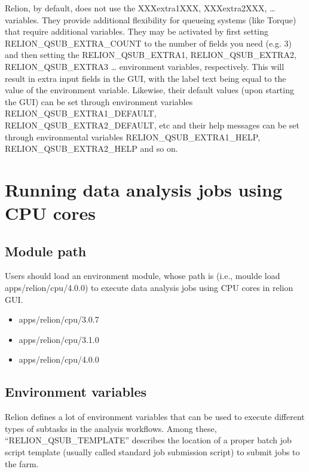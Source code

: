 \documentclass[a4paper,11pt,english]{sphinxmanual}
\begin{document}
\sphinxAtStartPar
Relion, by default, does not use the XXXextra1XXX, XXXextra2XXX, … variables.
They provide additional flexibility for queueing systems (like Torque) that require additional variables.
They may be activated by first setting RELION\_QSUB\_EXTRA\_COUNT to the number of fields you need (e.g. 3) and then setting the RELION\_QSUB\_EXTRA1, RELION\_QSUB\_EXTRA2, RELION\_QSUB\_EXTRA3 … environment variables, respectively.
This will result in extra input fields in the GUI, with the label text being equal to the value of the environment variable. Likewise, their default values (upon starting the GUI) can be set through environment variables RELION\_QSUB\_EXTRA1\_DEFAULT, RELION\_QSUB\_EXTRA2\_DEFAULT, etc and their help messages can be set through environmental variables RELION\_QSUB\_EXTRA1\_HELP, RELION\_QSUB\_EXTRA2\_HELP and so on.


\section{Running data analysis jobs using CPU cores}
\label{\detokenize{relion:running-data-analysis-jobs-using-cpu-cores}}

\subsection{Module path}
\label{\detokenize{relion:module-path}}
\sphinxAtStartPar
Users should load an environment module, whose path is   (i.e., moulde load apps/relion/cpu/4.0.0) to execute data analysis jobs using CPU cores in relion GUI.
\begin{itemize}
\item {} 
\sphinxAtStartPar
apps/relion/cpu/3.0.7

\item {} 
\sphinxAtStartPar
apps/relion/cpu/3.1.0

\item {} 
\sphinxAtStartPar
apps/relion/cpu/4.0.0

\end{itemize}


\subsection{Environment variables}
\label{\detokenize{relion:environment-variables}}
\sphinxAtStartPar
Relion defines a lot of environment variables that can be used to execute different types of subtasks in the analysis workflows. Among these, “RELION\_QSUB\_TEMPLATE” describes the location of a proper batch job script template (usually called standard job submission script) to submit jobs to the farm.
\end{document}
